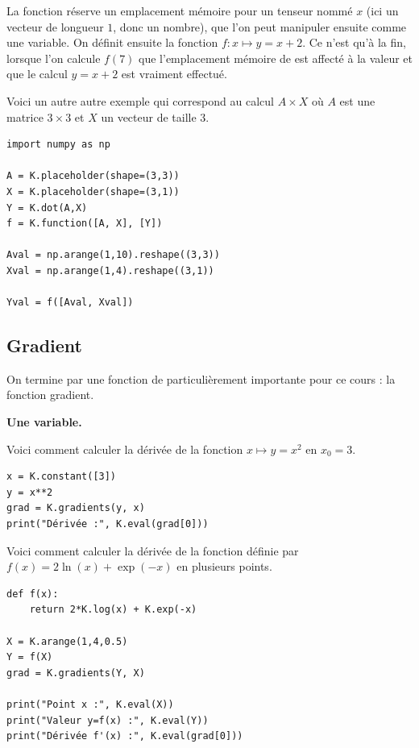 \documentclass[11pt,class=report,crop=false]{standalone}
\begin{document}
La fonction  réserve un emplacement mémoire pour un tenseur nommé $x$ (ici un vecteur de longueur $1$, donc un nombre), que l'on peut manipuler ensuite comme une variable.
On définit ensuite la fonction $f : x \mapsto y = x+2$. 
Ce n'est qu'à la fin, lorsque l'on calcule $f(7)$ que l'emplacement mémoire de  est affecté à  la valeur \ci{[7]} et que le calcul $y=x+2$ est vraiment effectué. 

\bigskip
Voici un autre autre exemple qui correspond au calcul $A \times X$ où $A$ est une matrice $3\times 3$ et $X$ un vecteur de taille $3$.

\begin{lstlisting}
import numpy as np

A = K.placeholder(shape=(3,3))
X = K.placeholder(shape=(3,1))
Y = K.dot(A,X)
f = K.function([A, X], [Y])

Aval = np.arange(1,10).reshape((3,3))
Xval = np.arange(1,4).reshape((3,1))

Yval = f([Aval, Xval])
\end{lstlisting}

\subsection{Gradient}


On termine par une fonction de \keras{} particulièrement importante pour ce cours : la fonction gradient.

\textbf{Une variable.}

Voici comment calculer la dérivée de la fonction $x \mapsto y=x^2$ en $x_0=3$.
\begin{lstlisting}
x = K.constant([3])
y = x**2
grad = K.gradients(y, x)
print("Dérivée :", K.eval(grad[0]))
\end{lstlisting}


Voici comment calculer la dérivée de la fonction définie par $f(x) = 2\ln(x)+\exp(-x)$ en plusieurs points.

\begin{lstlisting}
def f(x):
	return 2*K.log(x) + K.exp(-x)

X = K.arange(1,4,0.5)
Y = f(X)
grad = K.gradients(Y, X)

print("Point x :", K.eval(X))
print("Valeur y=f(x) :", K.eval(Y))
print("Dérivée f'(x) :", K.eval(grad[0]))
\end{lstlisting}
\end{document}
